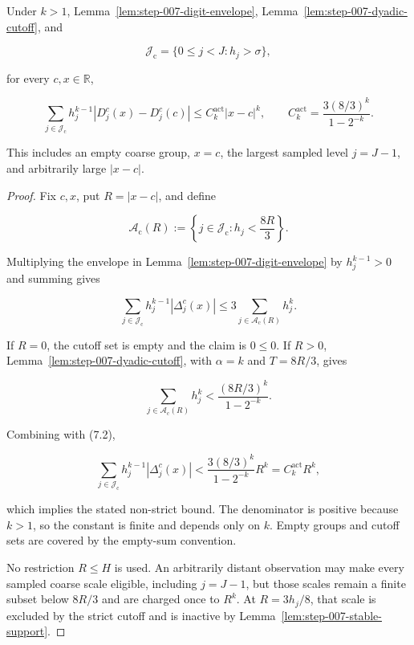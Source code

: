 \begin{proposition}\label{prop:step-007-coarse-ledger}
Under \(k>1\), Lemma~\ref{lem:step-007-digit-envelope}, Lemma~\ref{lem:step-007-dyadic-cutoff}, and

\[
\mathcal J_{\mathrm c}
=\{0\leq j<J:h_j>\sigma\},
\]

for every \(c,x\in\mathbb R\),

\[
\sum_{j\in\mathcal J_{\mathrm c}}
h_j^{k-1}\left|D_j^c(x)-D_j^c(c)\right|
\leq C_k^{\mathrm{act}}|x-c|^k,
\qquad
C_k^{\mathrm{act}}
=\frac{3(8/3)^k}{1-2^{-k}}.
\]

This includes an empty coarse group, \(x=c\), the largest sampled level \(j=J-1\), and arbitrarily large \(|x-c|\).
\end{proposition}

\begin{proof}
Fix \(c,x\), put \(R=|x-c|\), and define

\[
\mathcal A_{\mathrm c}(R)
:=\left\{j\in\mathcal J_{\mathrm c}:h_j<\frac{8R}{3}\right\}.
\]

Multiplying the envelope in Lemma~\ref{lem:step-007-digit-envelope} by \(h_j^{k-1}>0\) and summing gives

\[
\sum_{j\in\mathcal J_{\mathrm c}}
h_j^{k-1}|\Delta_j^c(x)|
\leq3\sum_{j\in\mathcal A_{\mathrm c}(R)}h_j^k.
\tag{7.2}
\]

If \(R=0\), the cutoff set is empty and the claim is \(0\leq0\). If \(R>0\), Lemma~\ref{lem:step-007-dyadic-cutoff}, with \(\alpha=k\) and \(T=8R/3\), gives

\[
\sum_{j\in\mathcal A_{\mathrm c}(R)}h_j^k
<\frac{(8R/3)^k}{1-2^{-k}}.
\]

Combining with (7.2),

\[
\sum_{j\in\mathcal J_{\mathrm c}}
h_j^{k-1}|\Delta_j^c(x)|
<\frac{3(8/3)^k}{1-2^{-k}}R^k
=C_k^{\mathrm{act}}R^k,
\]

which implies the stated non-strict bound. The denominator is positive because \(k>1\), so the constant is finite and depends only on \(k\). Empty groups and cutoff sets are covered by the empty-sum convention.

No restriction \(R\leq H\) is used. An arbitrarily distant observation may make every sampled coarse scale eligible, including \(j=J-1\), but those scales remain a finite subset below \(8R/3\) and are charged once to \(R^k\). At \(R=3h_j/8\), that scale is excluded by the strict cutoff and is inactive by Lemma~\ref{lem:step-007-stable-support}.
\end{proof}

